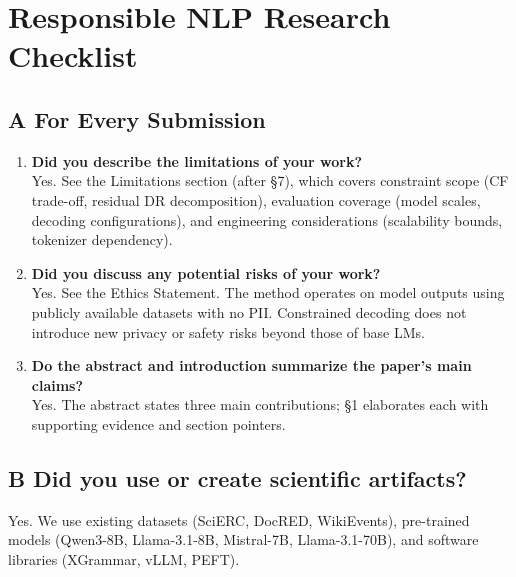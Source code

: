 
\section*{Responsible NLP Research Checklist}

\subsection*{A \hspace{0.5em} For Every Submission}

\begin{enumerate}[label=\textbf{A\arabic*.},leftmargin=2.5em]
\item \textbf{Did you describe the limitations of your work?}
\\ Yes. See the Limitations section (after \S7), which covers constraint scope (CF trade-off, residual DR decomposition), evaluation coverage (model scales, decoding configurations), and engineering considerations (scalability bounds, tokenizer dependency).

\item \textbf{Did you discuss any potential risks of your work?}
\\ Yes. See the Ethics Statement. The method operates on model outputs using publicly available datasets with no PII. Constrained decoding does not introduce new privacy or safety risks beyond those of base LMs.

\item \textbf{Do the abstract and introduction summarize the paper's main claims?}
\\ Yes. The abstract states three main contributions; \S1 elaborates each with supporting evidence and section pointers.
\end{enumerate}

\subsection*{B \hspace{0.5em} Did you use or create scientific artifacts?}
Yes. We use existing datasets (SciERC, DocRED, WikiEvents), pre-trained models (Qwen3-8B, Llama-3.1-8B, Mistral-7B, Llama-3.1-70B), and software libraries (XGrammar, vLLM, PEFT).


